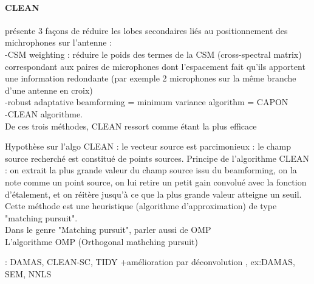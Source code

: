 \paragraph{CLEAN}


\cite{dougherty_1998} présente 3 façons de réduire les lobes secondaires liés au positionnement des michrophones sur l'antenne : \\
-CSM weighting : réduire le poids des termes de la CSM (cross-spectral matrix) correspondant aux paires de microphones dont l'espacement fait qu'ils apportent une information redondante (par exemple 2 microphones sur la même branche d'une antenne en croix)\\
-robust adaptative beamforming = minimum variance algorithm = CAPON\\
-CLEAN algorithme.\\
De ces trois méthodes, CLEAN ressort comme étant la plus efficace

Hypothèse sur l'algo CLEAN : le vecteur source est parcimonieux : le champ source recherché est constitué de points sources. Principe de l'algorithme CLEAN \citep{hogborn_1974} : on extrait la plus grande valeur du champ source issu du beamforming, on la note comme un point source, on lui retire un petit gain convolué avec la fonction d'étalement, et on réitère jusqu'à ce que la plus grande valeur atteigne un seuil.\\

Cette méthode est une heuristique (algorithme d'approximation) de type "matching pursuit".\\

Dans le genre "Matching pursuit", parler aussi de OMP\\
L'algorithme OMP (Orthogonal mathching pursuit)





  : DAMAS, CLEAN-SC, TIDY
+amélioration par déconvolution , ex:DAMAS, SEM, NNLS







